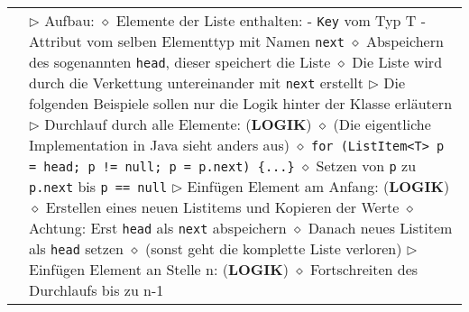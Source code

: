 \begin{longtable}{ | p{} p{} | }
	\makecell[l]{\texttt{LinkedList}} & \makecell[l]{
	$\rhd$ Aufbau: \\
	\hspace{0.4cm} $\diamond$ Elemente der Liste enthalten: \\
	\hspace{0.6cm} - \texttt{Key} vom Typ T \\
	\hspace{0.6cm} - Attribut vom selben Elementtyp mit Namen \texttt{next} \\
	\hspace{0.4cm} $\diamond$ Abspeichern des sogenannten \texttt{head}, dieser speichert die Liste \\
	\hspace{0.4cm} $\diamond$ Die Liste wird durch die Verkettung untereinander mit \texttt{next} erstellt \\
	$\rhd$ Die folgenden Beispiele sollen nur die Logik hinter der Klasse erläutern \\
	$\rhd$ Durchlauf durch alle Elemente: (\textbf{LOGIK})\\
	\hspace{0.4cm} $\diamond$ (Die eigentliche Implementation in Java sieht anders aus) \\
	\hspace{0.4cm} $\diamond$ \texttt{for (ListItem<T> p = head; p != null; p = p.next) \{...\}} \\
	\hspace{0.4cm} $\diamond$ Setzen von \texttt{p} zu \texttt{p.next} bis \texttt{p == null} \\
	$\rhd$ Einfügen Element am Anfang: (\textbf{LOGIK}) \\
	\hspace{0.4cm} $\diamond$ Erstellen eines neuen Listitems und Kopieren der Werte \\
	\hspace{0.4cm} $\diamond$ Achtung: Erst \texttt{head} als \texttt{next} abspeichern \\
	\hspace{0.4cm} $\diamond$ Danach neues Listitem als \texttt{head} setzen \\
	\hspace{0.4cm} $\diamond$ (sonst geht die komplette Liste verloren) \\
	$\rhd$ Einfügen Element an Stelle n: (\textbf{LOGIK}) \\
	\hspace{0.4cm} $\diamond$ Fortschreiten des Durchlaufs bis zu n-1 \\
}
\end{longtable}
